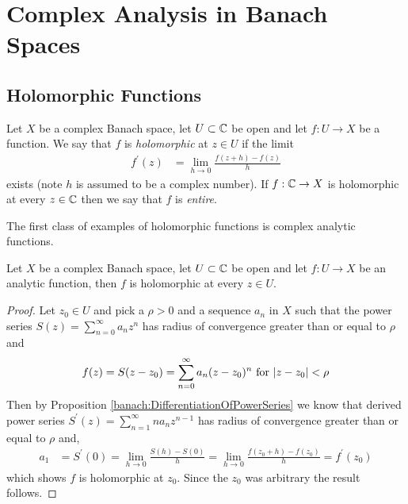 \chapter{Complex Analysis in Banach Spaces}

\section{Holomorphic Functions}

\begin{defn}Let $X$ be a complex Banach space, let $U \subset
  \mathbb{C}$ be open and let $f : U \to X$ be a function.   We say
  that $f$ is \emph{holomorphic} at $z \in U$ if the limit
  \begin{align*}
    f^\prime(z) &= \lim_{h \to 0} \frac{f(z+h) - f(z)}{h}
  \end{align*}
  exists (note $h$ is assumed to be a complex number).   If $f : \mathbb{C} \to X$ is holomorphic at every 
$z\in \mathbb{C}$ then we say that $f$ is \emph{entire}.
\end{defn}

The first class of examples of holomorphic functions is complex analytic functions.
\begin{prop}\label{banach:ComplexAnalyticImpliesHolomorphic}Let $X$ be a complex Banach space, let $U \subset
  \mathbb{C}$ be open and let $f : U \to X$ be an analytic function, then $f$ is holomorphic at every $z \in U$.
\end{prop}
\begin{proof}
  Let $z_0 \in U$ and pick a $\rho>0$ and a sequence $a_n$ in $X$ such that the power series $S(z) = \sum_{n=0}^\infty a_n z^n$ has radius of convergence greater than or equal to $\rho$ and 
  \begin{align*}
    f(z) = S(z - z_0) = \sum_{n=0}^\infty a_n (z - z_0)^n \text{ for $\left \vert z - z_0 \right \vert < \rho$}
  \end{align*}
  Then by Proposition \ref{banach:DifferentiationOfPowerSeries} we know that derived power series $S^\prime(z) = \sum_{n=1}^\infty n a_n z^{n-1}$ has radius of convergence greater than or equal to $\rho$ and,
  \begin{align*}
    a_1 &= S^\prime(0) = \lim_{h \to 0} \frac{S(h) - S(0)}{h} = \lim_{h \to 0} \frac{f(z_0 + h) - f(z_0)}{h} = f^\prime(z_0)
  \end{align*}
  which shows $f$ is holomorphic at $z_0$.   Since the $z_0$ was arbitrary the result follows.
\end{proof}

